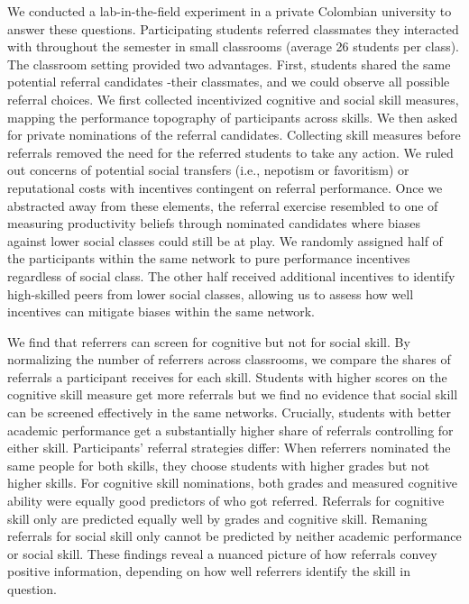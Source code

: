 \documentclass[11pt,a4paper,oneside]{article}
\begin{document}
We conducted a lab-in-the-field experiment in a private Colombian university to answer these questions. Participating students referred classmates they interacted with throughout the semester in small classrooms (average 26 students per class). The classroom setting provided two advantages. First, students shared the same potential referral candidates -their classmates, and we could observe all possible referral choices. We first collected incentivized cognitive and social skill measures, mapping the performance topography of participants across skills. We then asked for private nominations of the referral candidates. Collecting skill measures before referrals removed the need for the referred students to take any action. We ruled out concerns of potential social transfers (i.e., nepotism or favoritism) or reputational costs with incentives contingent on referral performance. Once we abstracted away from these elements, the referral exercise resembled to one of measuring productivity beliefs through nominated candidates where biases against lower social classes could still be at play. We randomly assigned half of the participants within the same network to pure performance incentives regardless of social class. The other half received additional incentives to identify high-skilled peers from lower social classes, allowing us to assess how well incentives can mitigate biases within the same network. 

We find that referrers can screen for cognitive but not for social skill. By normalizing the number of referrers across classrooms, we compare the shares of referrals a participant receives for each skill. Students with higher scores on the cognitive skill measure get more referrals but we find no evidence that social skill can be screened effectively in the same networks. Crucially, students with better academic performance get a substantially higher share of referrals controlling for either skill. Participants' referral strategies differ: When referrers nominated the same people for both skills, they choose students with higher grades but not higher skills. For cognitive skill nominations, both grades and measured cognitive ability were equally good predictors of who got referred. Referrals for cognitive skill only are predicted equally well by grades and cognitive skill. Remaning referrals for social skill only cannot be predicted by neither academic performance or social skill. These findings reveal a nuanced picture of how referrals convey positive information, depending on how well referrers identify the skill in question.
\end{document}
